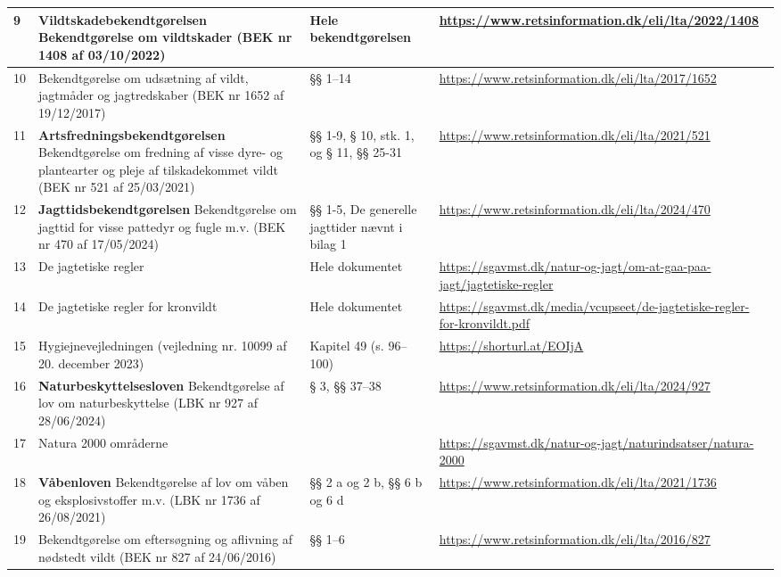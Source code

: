 \documentclass[10pt,a4paper]{article}
\begin{document}
{\begin{tabular}{|P{1.2cm}|P{5.5cm}|P{3.5cm}|P{6.5cm}|}
9 & \textbf{Vildtskadebekendtgørelsen} Bekendtgørelse om vildtskader (BEK nr 1408 af 03/10/2022) & Hele bekendtgørelsen & \url{https://www.retsinformation.dk/eli/lta/2022/1408} \\
\hline

10 & Bekendtgørelse om udsætning af vildt, jagtmåder og jagtredskaber (BEK nr 1652 af 19/12/2017) & §§ 1–14 & \url{https://www.retsinformation.dk/eli/lta/2017/1652} \\
\hline

11 & \textbf{Artsfredningsbekendtgørelsen} Bekendtgørelse om fredning af visse dyre- og plantearter og pleje af tilskadekommet vildt (BEK nr 521 af 25/03/2021) & §§ 1-9, § 10, stk. 1, og § 11, §§ 25-31 & \url{https://www.retsinformation.dk/eli/lta/2021/521} \\
\hline

12 & \textbf{Jagttidsbekendtgørelsen} Bekendtgørelse om jagttid for visse pattedyr og fugle m.v. (BEK nr 470 af 17/05/2024) & §§ 1-5, De generelle jagttider nævnt i bilag 1 & \url{https://www.retsinformation.dk/eli/lta/2024/470} \\
\hline

13 & De jagtetiske regler & Hele dokumentet & \url{https://sgavmst.dk/natur-og-jagt/om-at-gaa-paa-jagt/jagtetiske-regler} \\
\hline

14 & De jagtetiske regler for kronvildt & Hele dokumentet & \url{https://sgavmst.dk/media/vcupseet/de-jagtetiske-regler-for-kronvildt.pdf} \\
\hline

15 & Hygiejnevejledningen (vejledning nr. 10099 af 20. december 2023) & Kapitel 49 (s. 96–100) & \url{https://shorturl.at/EOIjA} \\
\hline

16 & \textbf{Naturbeskyttelsesloven} Bekendtgørelse af lov om naturbeskyttelse (LBK nr 927 af 28/06/2024) & § 3, §§ 37–38  & \url{https://www.retsinformation.dk/eli/lta/2024/927} \\
\hline

17 & Natura 2000 områderne & & \url{https://sgavmst.dk/natur-og-jagt/naturindsatser/natura-2000} \\
\hline

18 & \textbf{Våbenloven} Bekendtgørelse af lov om våben og eksplosivstoffer m.v. (LBK nr 1736 af 26/08/2021) & §§ 2 a og 2 b, §§ 6 b og 6 d & \url{https://www.retsinformation.dk/eli/lta/2021/1736} \\
\hline

19 & Bekendtgørelse om eftersøgning og aflivning af nødstedt vildt (BEK nr 827 af 24/06/2016) & §§ 1–6 & \url{https://www.retsinformation.dk/eli/lta/2016/827} \\
\hline

\end{tabular}
}

\vspace{1cm}
\end{document}
